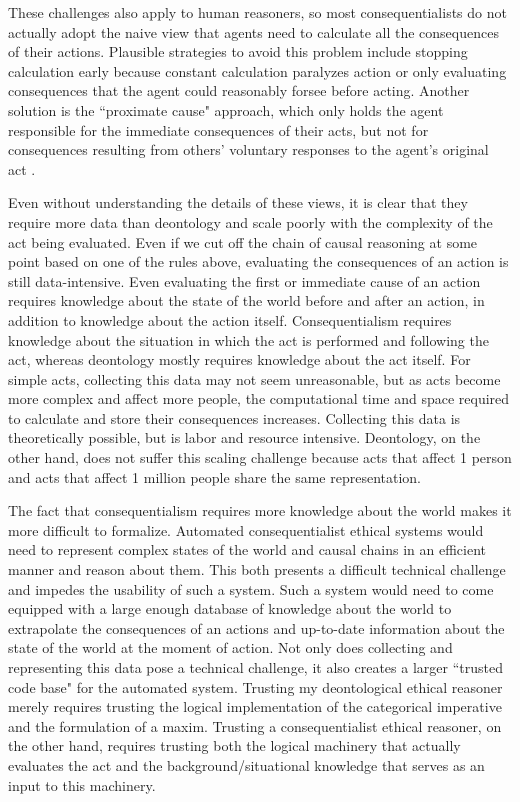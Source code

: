 \begin{isabellebody}
\begin{isamarkuptext}
These challenges also apply to human reasoners, so most consequentialists do not actually adopt the naive
view that agents need to calculate all the consequences of their actions. Plausible strategies to avoid 
this problem include stopping calculation early because constant calculation paralyzes action or only 
evaluating consequences that the agent could reasonably forsee before acting. Another solution is the 
``proximate cause" approach, which only holds the agent responsible for the immediate consequences of their 
acts, but not for consequences resulting from others' voluntary responses to the agent's original act \citep{consequentialismsep}.

Even without understanding the details of these views, it is clear that they require 
more data than deontology and scale poorly with the complexity of the act being evaluated. Even 
if we cut off the chain of causal reasoning at some point based on 
one of the rules above, evaluating the consequences of an action is still data-intensive. Even evaluating
the first or immediate cause of an action requires knowledge about the state of the world before
and after an action, in addition to knowledge about the action itself. Consequentialism requires 
knowledge about 
the situation in which the act is performed and following the act, whereas deontology mostly requires 
knowledge about the act itself. For simple acts, collecting this data may not seem unreasonable, but as acts become
more complex and affect more people, the computational time and space required to calculate and store
their consequences increases. Collecting this data is theoretically possible, but is labor and resource
intensive. Deontology, on the other hand, does not suffer this scaling
challenge because acts that affect 1 person and acts that affect 1 million people share the same
representation.

The fact that consequentialism requires more knowledge about the world makes it more difficult to formalize.
Automated consequentialist ethical systems would need to represent complex states of the world and causal chains
in an efficient manner and reason about them. This both presents a difficult technical challenge and
impedes the usability of such a system. Such a system would need to come equipped with 
a large enough database of knowledge about the world to extrapolate the consequences of an actions and
up-to-date information about the state of the world at the moment of action. Not only does collecting 
and representing this data pose a technical challenge, it also creates a larger ``trusted code base" for 
the automated system. Trusting my deontological ethical reasoner merely requires trusting the logical implementation
of the categorical imperative and the formulation of a maxim. Trusting a consequentialist ethical 
reasoner, on the other hand, requires trusting both the logical machinery that actually evaluates the act and the 
background/situational knowledge that serves as an input to this machinery.


\end{isamarkuptext}
\end{isabellebody}
